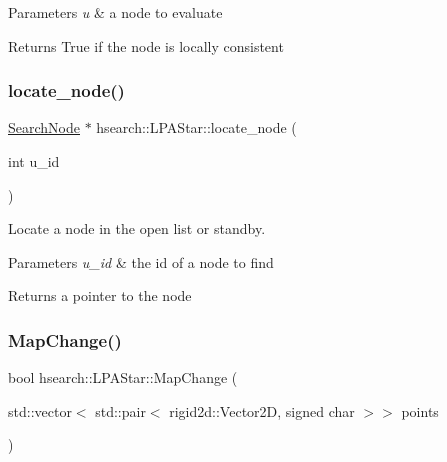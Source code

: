 \begin{DoxyParams}{Parameters}
{\em u} & a node to evaluate \\
\hline
\end{DoxyParams}
\begin{DoxyReturn}{Returns}
True if the node is locally consistent 
\end{DoxyReturn}
\mbox{\label{classhsearch_1_1LPAStar_ad5b74c1a38d9db460324fcb1784ac114}} 
\subsubsection{\texorpdfstring{locate\+\_\+node()}{locate\_node()}}
{\footnotesize\ttfamily \hyperlink{structhsearch_1_1SearchNode}{Search\+Node} $\ast$ hsearch\+::\+L\+P\+A\+Star\+::locate\+\_\+node (\begin{DoxyParamCaption}\item[{int}]{u\+\_\+id }\end{DoxyParamCaption})\hspace{0.3cm}{\ttfamily [protected]}}



Locate a node in the open list or standby. 


\begin{DoxyParams}{Parameters}
{\em u\+\_\+id} & the id of a node to find \\
\hline
\end{DoxyParams}
\begin{DoxyReturn}{Returns}
a pointer to the node 
\end{DoxyReturn}
\mbox{\label{classhsearch_1_1LPAStar_ad5ba304f7a500b285d4878ee2090f7c3}} 
\subsubsection{\texorpdfstring{Map\+Change()}{MapChange()}}
{\footnotesize\ttfamily bool hsearch\+::\+L\+P\+A\+Star\+::\+Map\+Change (\begin{DoxyParamCaption}\item[{std\+::vector$<$ std\+::pair$<$ rigid2d\+::\+Vector2D, signed char $>$$>$}]{points }\end{DoxyParamCaption})}



